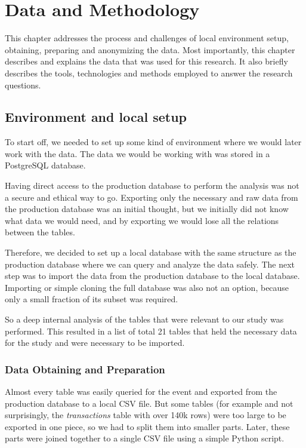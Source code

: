 \chapter{Data and Methodology}
\label{ch:data-methodology}
This chapter addresses the process and challenges of local environment setup, obtaining, preparing and anonymizing the data.
Most importantly, this chapter describes and explains the data that was used for this research.
It also briefly describes the tools, technologies and methods employed to answer the research questions.


\section{Environment and local setup}
\label{sec:data-methodology-environment}

To start off, we needed to set up some kind of environment where we would later work with the data.
The data we would be working with was stored in a PostgreSQL database.

Having direct access to the production database to perform the analysis was not a secure and ethical way to go.
Exporting only the necessary and raw data from the production database was an initial thought, but we initially did not know what data we would need, and by exporting we would lose all the relations between the tables.

Therefore, we decided to set up a local database with the same structure as the production database where we can query and analyze the data safely.
The next step was to import the data from the production database to the local database.
Importing or simple cloning the full database was also not an option, because only a small fraction of its subset was required.

So a deep internal analysis of the tables that were relevant to our study was performed.
This resulted in a list of total 21 tables that held the necessary data for the study and were necessary to be imported.

\subsection{Data Obtaining and Preparation}
\label{subsec:data-methodology-obtaining-preparation}

Almost every table was easily queried for the event and exported from the production database to a local CSV file.
But some tables (for example and not surprisingly, the \textit{transactions} table with over 140k rows) were too large to be exported in one piece, so we had to split them into smaller parts.
Later, these parts were joined together to a single CSV file using a simple Python script.

